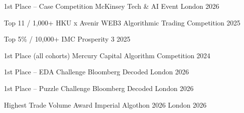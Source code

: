 

\begin{cvhonors}

  \cvhonor
    {1st Place -- Case Competition} %
    {McKinsey Tech \& AI Event} %
    {London} %
    {2026} %

  \cvhonor
    {Top 11 / 1,000+} %
    {HKU x Avenir WEB3 Algorithmic Trading Competition} %
    {} %
    {2025} %

  \cvhonor
    {Top 5\% / 10,000+} %
    {IMC Prosperity 3} %
    {} %
    {2025} %

  \cvhonor
    {1st Place (all cohorts)} %
    {Mercury Capital Algorithm Competition} %
    {} %
    {2024} %

  \cvhonor
    {1st Place -- EDA Challenge} %
    {Bloomberg Decoded} %
    {London} %
    {2026} %

  \cvhonor
    {1st Place -- Puzzle Challenge} %
    {Bloomberg Decoded} %
    {London} %
    {2026} %

  \cvhonor
    {Highest Trade Volume Award} %
    {Imperial Algothon 2026} %
    {London} %
    {2026} %

\end{cvhonors}
